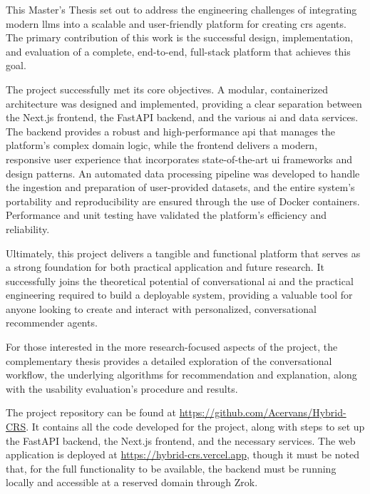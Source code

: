 This Master's Thesis set out to address the engineering challenges of integrating modern \acp{llm} into a scalable and user-friendly platform for creating \acs{crs} agents. The primary contribution of this work is the successful design, implementation, and evaluation of a complete, end-to-end, full-stack platform that achieves this goal.

The project successfully met its core objectives. A modular, containerized architecture was designed and implemented, providing a clear separation between the Next.js frontend, the FastAPI backend, and the various \acs{ai} and data services. The backend provides a robust and high-performance \ac{api} that manages the platform's complex domain logic, while the frontend delivers a modern, responsive user experience that incorporates state-of-the-art \acs{ui} frameworks and design patterns. An automated data processing pipeline was developed to handle the ingestion and preparation of user-provided datasets, and the entire system's portability and reproducibility are ensured through the use of Docker containers. Performance and unit testing have validated the platform's efficiency and reliability.

Ultimately, this project delivers a tangible and functional platform that serves as a strong foundation for both practical application and future research. It successfully joins the theoretical potential of conversational \acs{ai} and the practical engineering required to build a deployable system, providing a valuable tool for anyone looking to create and interact with personalized, conversational recommender agents. 

For those interested in the more research-focused aspects of the project, the complementary thesis \cite{MUI2ICSI_THESIS} provides a detailed exploration of the conversational workflow, the underlying algorithms for recommendation and explanation, along with the usability evaluation's procedure and results.

The project repository can be found at \url{https://github.com/Acervans/Hybrid-CRS}. It contains all the code developed for the project, along with steps to set up the FastAPI backend, the Next.js frontend, and the necessary services. The web application is deployed at \url{https://hybrid-crs.vercel.app}, though it must be noted that, for the full functionality to be available, the backend must be running locally and accessible at a reserved domain through Zrok.
